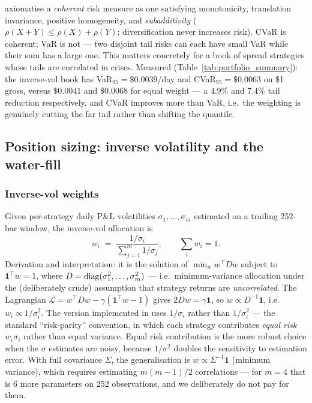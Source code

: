 \cite{artzner1999coherent} axiomatise a \emph{coherent} risk measure as one satisfying
monotonicity, translation invariance, positive homogeneity, and \emph{subadditivity}
($\rho(X+Y)\le\rho(X)+\rho(Y)$: diversification never increases risk). CVaR is coherent;
VaR is not --- two disjoint tail risks can each have small VaR while their sum has a large
one. This matters concretely for a book of spread strategies whose tails are correlated in
crises. Measured (Table~\ref{tab:portfolio_summary}): the inverse-vol book has
VaR$_{95}=\$0.0039$/day and CVaR$_{95}=\$0.0063$ on \$1 gross, versus $\$0.0041$ and
$\$0.0068$ for equal weight --- a $4.9\%$ and $7.4\%$ tail reduction respectively, and
CVaR improves more than VaR, i.e.\ the weighting is genuinely cutting the far tail rather
than shifting the quantile.

\subsection{Position sizing: inverse volatility and the water-fill}
\label{sec:bt:sizing}

\subsubsection{Inverse-vol weights}

Given per-strategy daily P\&L volatilities $\sigma_1,\dots,\sigma_m$ estimated on a
trailing 252-bar window, the inverse-vol allocation is
\begin{equation}
  w_i \;=\; \frac{1/\sigma_i}{\sum_{j=1}^{m} 1/\sigma_j},
  \qquad \sum_i w_i = 1 .
  \label{eq:inversevol}
\end{equation}
Derivation and interpretation: it is the solution of
$\min_w w^{\top}Dw$ subject to $\mathbf 1^{\top}w=1$, where $D=\operatorname{diag}(\sigma_1^2,\dots,
\sigma_m^2)$ --- i.e.\ minimum-variance allocation under the (deliberately crude)
assumption that strategy returns are \emph{uncorrelated}. The Lagrangian
$\mathcal L = w^{\top}Dw-\gamma(\mathbf 1^{\top}w-1)$ gives $2Dw=\gamma\mathbf 1$, so
$w\propto D^{-1}\mathbf 1$, i.e.\ $w_i\propto1/\sigma_i^2$. The version implemented in
 uses $1/\sigma_i$ rather than $1/\sigma_i^2$ --- the standard
``risk-parity'' convention, in which each strategy contributes \emph{equal risk}
$w_i\sigma_i$ rather than equal variance. Equal risk contribution is the more robust
choice when the $\sigma$ estimates are noisy, because $1/\sigma^2$ doubles the sensitivity
to estimation error. With full covariance $\Sigma$, the generalisation is
$w\propto\Sigma^{-1}\mathbf 1$ (minimum variance), which requires estimating
$m(m-1)/2$ correlations --- for $m=4$ that is 6 more parameters on 252 observations, and
we deliberately do not pay for them.


